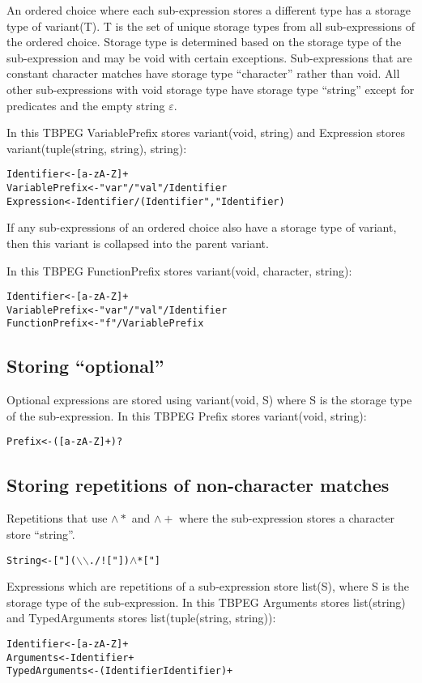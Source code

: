 \documentclass[a4paper,11pt]{article}
\begin{document}
An ordered choice where each sub-expression stores a different type has a storage type of variant(T).
T is the set of unique storage types from all sub-expressions of the ordered choice.
Storage type is determined based on the storage type of the sub-expression and may be void with certain exceptions.
Sub-expressions that are constant character matches have storage type ``character'' rather than void.
All other sub-expressions with void storage type have storage type ``string'' except for predicates and the empty string $\varepsilon$.

In this TBPEG VariablePrefix stores variant(void, string) and Expression stores variant(tuple(string, string), string):
\begin{alltt}
    Identifier     <- [a-zA-Z]+
    VariablePrefix <- "var" / "val" / Identifier
    Expression     <- Identifier / (Identifier "," Identifier)
\end{alltt}

If any sub-expressions of an ordered choice also have a storage type of variant, then this variant is collapsed into the parent variant.

In this TBPEG FunctionPrefix stores variant(void, character, string):
\begin{alltt}
    Identifier     <- [a-zA-Z]+
    VariablePrefix <- "var" / "val" / Identifier
    FunctionPrefix <- "f" / VariablePrefix
\end{alltt}

\subsection{Storing ``optional''}
Optional expressions are stored using variant(void, S) where S is the storage type of the sub-expression.
In this TBPEG Prefix stores variant(void, string):
\begin{alltt}
    Prefix <- ([a-zA-Z]+)?
\end{alltt}

\subsection{Storing repetitions of non-character matches}
Repetitions that use $\wedge *$ and $\wedge +$ where the sub-expression stores a character store ``string''.
\begin{alltt}
    String <- ["] (\(\backslash\)\(\backslash\) . / ! ["] )\(\wedge\)* ["]
\end{alltt}

Expressions which are repetitions of a sub-expression store list(S), where S is the storage type of the sub-expression.
In this TBPEG Arguments stores list(string) and TypedArguments stores list(tuple(string, string)):
\begin{alltt}
    Identifier     <- [a-zA-Z]+
    Arguments      <- Identifier+
    TypedArguments <- (Identifier Identifier)+
\end{alltt}
\end{document}
